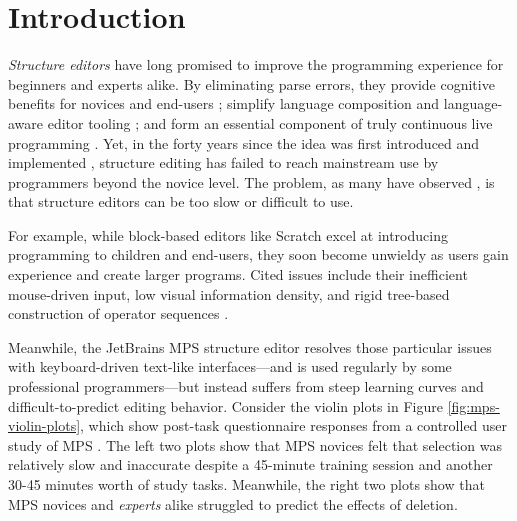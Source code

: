 \section{Introduction}\label{sec:intro}

\emph{Structure editors}
have long promised to improve the programming experience
for beginners and experts alike.
By eliminating parse errors,
they provide cognitive benefits for novices
  \cite{meta-analysis-blocks,blocks-text-high-school,coblox}
  and end-users
  \cite{weitnauer2016graspable,rousillon,BasHermans21};
  simplify language composition
  \cite{mbeddr}
  and language-aware editor tooling
  \cite{HazelnutSNAPL};
  and form an essential component of truly continuous live programming
  \cite{Hazelnut,HazelnutLive}.
Yet, in the forty years since the idea was first
introduced and implemented \cite{Cornell},
structure editing has failed to reach
mainstream use by programmers beyond the novice level.
The problem, as many have observed
\cite{user-modeling,fine-tuning-selection-semantics,
practical-lang-based-editing,lang-on-the-usefulness,
psg,Minor92,TowardUserFriendly,MillerPMV94},
is that structure editors can be too slow
or difficult to use.

For example, while
block-based editors like Scratch \cite{scratch}
excel at introducing programming
to children and end-users, they soon become unwieldy
as users gain experience and create larger programs.
Cited issues include their inefficient mouse-driven
input, low visual information density, and rigid
tree-based construction of operator sequences
\cite{BlocksFingertips,cog-dim-blocks,blocks-and-beyond,no-keyboard-cripples}.

Meanwhile, the JetBrains MPS \cite{DBLP:conf/icse/VoelterP12}
structure editor resolves those particular issues with
keyboard-driven text-like interfaces---and
is used regularly by some professional programmers---but
instead suffers from steep learning curves and difficult-to-predict
editing behavior.
Consider the violin plots in Figure \ref{fig:mps-violin-plots},
which show post-task questionnaire responses from
a controlled user study of MPS \cite{ProjEfficiency}.
The left two plots show that MPS novices felt that
selection was relatively slow and inaccurate despite
a 45-minute training session and another 30-45 minutes
worth of study tasks.
Meanwhile, the right two plots show that
MPS novices and \emph{experts} alike struggled to
predict the effects of deletion.

